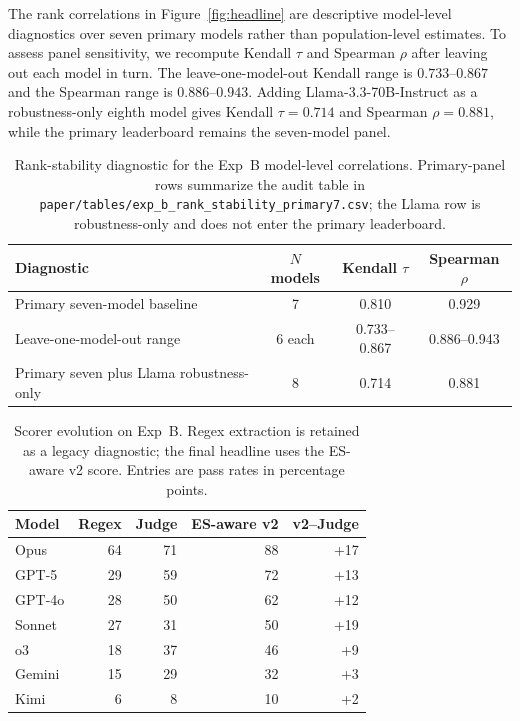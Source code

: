 \documentclass{article}
\begin{document}
The rank correlations in Figure~\ref{fig:headline} are descriptive
model-level diagnostics over seven primary models rather than population-level
estimates. To assess panel sensitivity, we recompute Kendall $\tau$ and
Spearman $\rho$ after leaving out each model in turn. The leave-one-model-out
Kendall range is $0.733$--$0.867$ and the Spearman range is
$0.886$--$0.943$. Adding Llama-3.3-70B-Instruct as a robustness-only eighth
model gives Kendall $\tau=0.714$ and Spearman $\rho=0.881$, while the primary
leaderboard remains the seven-model panel.

\begin{table}[h]
\centering
\caption{Rank-stability diagnostic for the Exp~B model-level correlations.
Primary-panel rows summarize the audit table in
\texttt{paper/tables/exp\_b\_rank\_stability\_primary7.csv}; the Llama row is
robustness-only and does not enter the primary leaderboard.}
\label{tab:rank-stability}
\small
\renewcommand{\arraystretch}{1.08}
\begin{tabular}{lccc}
\toprule
\textbf{Diagnostic} & \textbf{$N$ models} & \textbf{Kendall $\tau$} &
\textbf{Spearman $\rho$} \\
\midrule
Primary seven-model baseline & 7 & 0.810 & 0.929 \\
Leave-one-model-out range & 6 each & 0.733--0.867 & 0.886--0.943 \\
Primary seven plus Llama robustness-only & 8 & 0.714 & 0.881 \\
\bottomrule
\end{tabular}
\end{table}

\begin{table}[h]
\centering
\caption{Scorer evolution on Exp~B. Regex extraction is retained as a legacy
diagnostic; the final headline uses the ES-aware v2 score. Entries are pass
rates in percentage points.}
\label{tab:scorer-evolution}
\small
\renewcommand{\arraystretch}{1.08}
\begin{tabular}{lrrrr}
\toprule
\textbf{Model} & \textbf{Regex} & \textbf{Judge} &
\textbf{ES-aware v2} & \textbf{v2--Judge} \\
\midrule
Opus & 64 & 71 & 88 & +17 \\
GPT-5 & 29 & 59 & 72 & +13 \\
GPT-4o & 28 & 50 & 62 & +12 \\
Sonnet & 27 & 31 & 50 & +19 \\
o3 & 18 & 37 & 46 & +9 \\
Gemini & 15 & 29 & 32 & +3 \\
Kimi & 6 & 8 & 10 & +2 \\
\bottomrule
\end{tabular}
\end{table}
\end{document}
